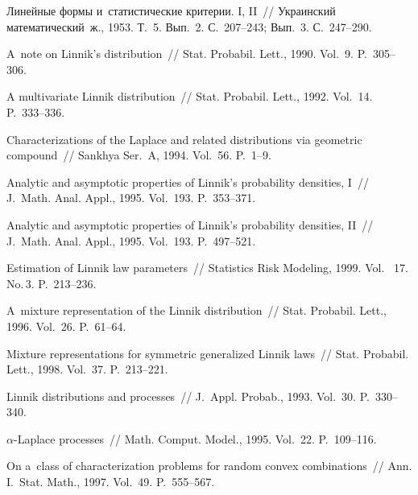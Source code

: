 \begin{multicols}{2}
{{\begin{thebibliography}{99}
 Линейные формы и~статистические критерии.  I, II~//
Украинский математический~ж., 1953.
Т.~5. Вып.~2. С.~207--243; Вып.~3. С.~247--290.



 A~note on Linnik's distribution~// Stat. Probabil. Lett., 
1990. Vol.~9. P.~305--306.



 A multivariate Linnik distribution~//
Stat.  Probabil. Lett., 1992. Vol.~14. P.~333--336.

 Characterizations of the Laplace and related
distributions via geometric compound~// Sankhya Ser.~A, 
1994. Vol.~56. P.~1--9.

 Analytic and asymptotic properties 
of Linnik's probability densities, I~// J.~Math. Anal. Appl., 1995. Vol.~193. 
P.~353--371.

Analytic and asymptotic properties of Linnik's probability densities, II~// 
J.~Math. Anal.  Appl., 1995. Vol.~193. P.~497--521.

 Estimation of
Linnik law parameters~// Statistics Risk Modeling, 1999. Vol. ~17. No.\,3. P.~213--236.



 A~mixture representation of the
Linnik distribution~// Stat. Probabil. Lett., 1996. Vol.~26. P.~61--64.

 Mixture representations for symmetric generalized
Linnik laws~// Stat. Probabil. Lett., 1998. Vol.~37. P.~213--221.

 Linnik distributions and
processes~// J.~Appl. Probab., 1993. Vol.~30. P.~330--340.

 $\alpha$-Laplace processes~// 
Math. Comput. Model., 1995. Vol.~22. P.~109--116.

 On 
a~class of characterization problems for random convex combinations~// 
Ann. I.~Stat. Math., 1997. Vol.~49. P.~555--567.




\end{thebibliography}}}
\end{multicols}
